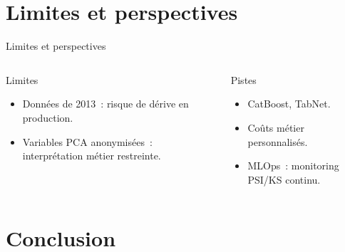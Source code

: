 \documentclass[aspectratio=169,11pt]{beamer}
\begin{document}
\section{Limites et perspectives}

\begin{frame}{Limites et perspectives}
  \begin{columns}[T,onlytextwidth]
      \begin{alertblock}{Limites}
        \begin{itemize}
          \item Données de 2013~: risque de dérive en production.
          \item Variables PCA anonymisées~: interprétation métier restreinte.
        \end{itemize}
      \end{alertblock}
      \begin{exampleblock}{Pistes}
        \begin{itemize}
          \item CatBoost, TabNet.
          \item Coûts métier personnalisés.
          \item MLOps~: monitoring PSI/KS continu.
        \end{itemize}
      \end{exampleblock}
  \end{columns}
\end{frame}

\section{Conclusion}
\end{document}
